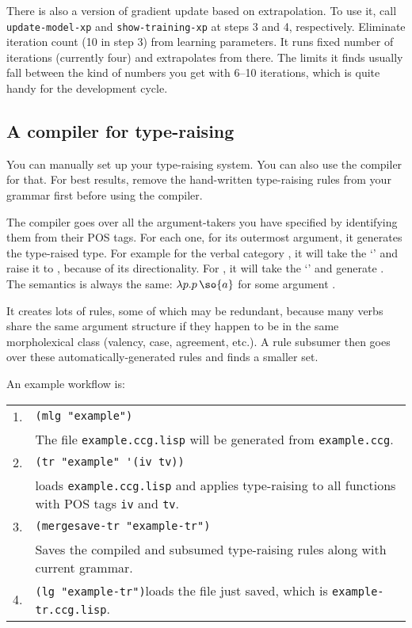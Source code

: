\documentclass[11pt]{article}
\begin{document}
{There is also a version of gradient update based on extrapolation. {To use it, call }
\verb+update-model-xp+ and \verb+show-training-xp+ {at steps 3 and 4, respectively. Eliminate iteration count (10 in step 3) from learning parameters.}
It runs  fixed number of iterations (currently four) and extrapolates from there.
The limits it finds usually fall between the kind of numbers you get with 6--10 iterations, which is quite handy for the  development cycle. 


\subsection{A compiler for type-raising}
{You can manually set up your type-raising system. You can also use the compiler for that. For best results, remove the hand-written type-raising rules from your grammar first before using the compiler.}

{The compiler goes over all the argument-takers you have specified by identifying them from their POS tags. For each one, for its outermost argument, it generates
the type-raised type. For example for the verbal category , it will take the `\fs{}' and raise it to , because of its directionality. For , it will take the `\bs{}' and generate
.
The semantics is always the same: $\lambda p.p\,\so{a}$ for some argument .}

{It creates lots of rules, some of which may be redundant, because many verbs share the same argument structure if they happen to be in the same morpholexical class (valency, case, agreement, etc.). A rule subsumer then goes over these automatically-generated rules
and finds a smaller set.}

An example workflow is:

\begin{tabular}{ll}
1.  & \verb|(mlg "example")| \\ &
The file \verb+example.ccg.lisp+ will be generated from \verb+example.ccg+. \\
2. & \verb+(tr "example" '(iv tv))+\\
& loads \verb+example.ccg.lisp+ and applies type-raising to all functions with POS tags \verb+iv+ and \verb+tv+.\\
3. & \verb+(mergesave-tr "example-tr")+\\
& Saves the compiled and subsumed type-raising rules along with current grammar.\\
4. & \verb+(lg "example-tr")+\hfill loads the file just saved, which is
\verb+example-tr.ccg.lisp+.\\
\end{tabular}\medskip

}
\end{document}
